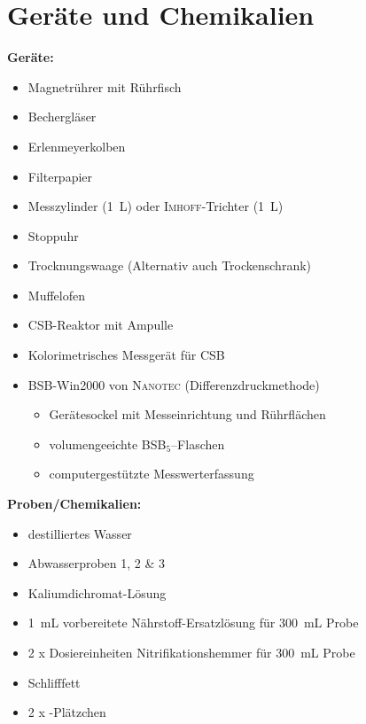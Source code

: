 \chapter{Geräte und Chemikalien}
\label{sec:geraete}

\textbf{Geräte:}
\begin{itemize}
	\item Magnetrührer mit Rührfisch
	\item Bechergläser
	\item Erlenmeyerkolben
	\item Filterpapier
	\item Messzylinder (\SI{1}{\liter}) oder \textsc{Imhoff}-Trichter (\SI{1}{\liter})
	\item Stoppuhr
	\item Trocknungswaage (Alternativ auch Trockenschrank)
	\item Muffelofen
	\item CSB-Reaktor mit Ampulle
	\item Kolorimetrisches Messgerät für CSB
	\item BSB-Win2000 von \textsc{Nanotec} (Differenzdruckmethode)
		\begin{itemize}
			\item Gerätesockel mit Messeinrichtung und Rührflächen
			\item volumengeeichte BSB$_5$–Flaschen
			\item computergestützte Messwerterfassung 
		\end{itemize}
	
\end{itemize}

\vspace*{5mm}

\textbf{Proben/Chemikalien:}
\begin{itemize}
	\item destilliertes Wasser
	\item Abwasserproben 1, 2 \& 3
	\item Kaliumdichromat-Lösung
	\item \SI{1}{\milli \liter} vorbereitete Nährstoff-Ersatzlösung für \SI{300}{\milli \liter} Probe
	\item 2 x Dosiereinheiten Nitrifikationshemmer für \SI{300}{\milli \liter} Probe
	\item Schlifffett
	\item 2 x -Plätzchen
\end{itemize}



